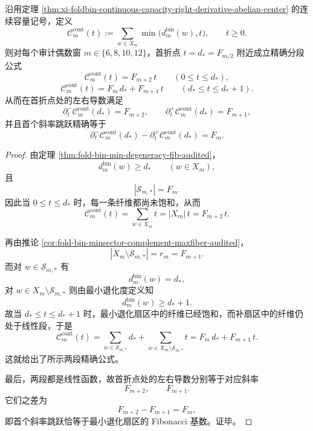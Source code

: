 \begin{theorem}\label{thm:xi-audited-even-first-capacity-kink-fibonacci-jump}
沿用定理 \ref{thm:xi-foldbin-continuous-capacity-right-derivative-abelian-center} 的连续容量记号，定义
\[
\mathcal C_m^{\mathrm{cont}}(t):=\sum_{w\in X_m}\min\bigl(d_m^{\mathrm{bin}}(w),t\bigr),
\qquad t\ge 0.
\]
则对每个审计偶数窗 \(m\in\{6,8,10,12\}\)，首折点 \(t=d_*=F_{m/2}\) 附近成立精确分段公式
\[
\boxed{\;
\mathcal C_m^{\mathrm{cont}}(t)=F_{m+2}\,t
\qquad
(0\le t\le d_*),\;}
\]
\[
\boxed{\;
\mathcal C_m^{\mathrm{cont}}(t)=F_m\,d_*+F_{m+1}\,t
\qquad
(d_*\le t\le d_*+1).\;}
\]
从而在首折点处的左右导数满足
\[
\boxed{\;
\partial_t^{-}\mathcal C_m^{\mathrm{cont}}(d_*)=F_{m+2},
\qquad
\partial_t^{+}\mathcal C_m^{\mathrm{cont}}(d_*)=F_{m+1},\;}
\]
并且首个斜率跳跃精确等于
\[
\boxed{\;
\partial_t^{-}\mathcal C_m^{\mathrm{cont}}(d_*)-\partial_t^{+}\mathcal C_m^{\mathrm{cont}}(d_*)
=
F_m.\;}
\]
\end{theorem}
\begin{proof}
由定理 \ref{thm:fold-bin-min-degeneracy-fib-audited}，
\[
d_m^{\mathrm{bin}}(w)\ge d_*
\qquad (w\in X_m),
\]
且
\[
|\mathcal S_{m,*}|=F_m.
\]
因此当 \(0\le t\le d_*\) 时，每一条纤维都尚未饱和，从而
\[
\mathcal C_m^{\mathrm{cont}}(t)
=
\sum_{w\in X_m} t
=
|X_m|\,t
=
F_{m+2}\,t.
\]

再由推论 \ref{cor:fold-bin-minsector-complement-maxfiber-audited}，
\[
|X_m\setminus \mathcal S_{m,*}|=r_m=F_{m+1}.
\]
而对 \(w\in\mathcal S_{m,*}\) 有
\[
d_m^{\mathrm{bin}}(w)=d_*,
\]
对 \(w\in X_m\setminus \mathcal S_{m,*}\) 则由最小退化度定义知
\[
d_m^{\mathrm{bin}}(w)\ge d_*+1.
\]
故当 \(d_*\le t\le d_*+1\) 时，最小退化扇区中的纤维已经饱和，而补扇区中的纤维仍处于线性段，于是
\[
\mathcal C_m^{\mathrm{cont}}(t)
=
\sum_{w\in\mathcal S_{m,*}} d_*
+
\sum_{w\in X_m\setminus \mathcal S_{m,*}} t
=
F_m\,d_*+F_{m+1}\,t.
\]
这就给出了所示两段精确公式。

最后，两段都是线性函数，故首折点处的左右导数分别等于对应斜率
\[
F_{m+2},
\qquad
F_{m+1}.
\]
它们之差为
\[
F_{m+2}-F_{m+1}=F_m,
\]
即首个斜率跳跃恰等于最小退化扇区的 Fibonacci 基数。证毕。
\end{proof}

